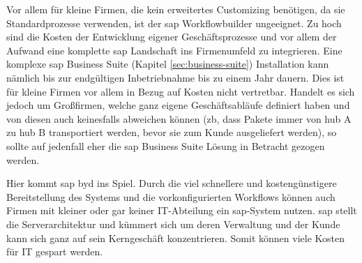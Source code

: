 
Vor allem für kleine Firmen, die kein erweitertes Customizing benötigen, da sie Standardprozesse verwenden, ist der \gls{sap} Workflowbuilder ungeeignet. Zu hoch sind die Kosten der Entwicklung eigener Geschäftsprozesse und vor allem der Aufwand eine komplette \gls{sap} Landschaft ins Firmenumfeld zu integrieren. Eine komplexe \gls{sap} Business Suite (Kapitel \ref{sec:business-suite}) Installation kann nämlich bis zur endgültigen Inbetriebnahme bis zu einem Jahr dauern. Dies ist für kleine Firmen vor allem in Bezug auf Kosten nicht vertretbar. Handelt es sich jedoch um Großfirmen, welche ganz eigene Geschäftsabläufe definiert haben und von diesen auch keinesfalls abweichen können (\gls{zb}, dass Pakete immer von \gls{hub} A zu \gls{hub} B transportiert werden, bevor sie zum Kunde ausgeliefert werden), so sollte auf jedenfall eher die \gls{sap} Business Suite Lösung in Betracht gezogen werden.

Hier kommt \gls{sap} \gls{byd} ins Spiel. Durch die viel schnellere und kostengünstigere Bereitstellung des Systems und die vorkonfigurierten Workflows können auch Firmen mit kleiner oder gar keiner IT-Abteilung ein \gls{sap}-System nutzen. \gls{sap} stellt die Serverarchitektur und kümmert sich um deren Verwaltung und der Kunde kann sich ganz auf sein Kerngeschäft konzentrieren. Somit können viele Kosten für IT gespart werden.


